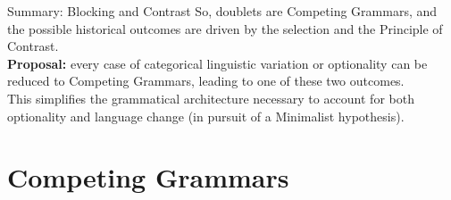 \documentclass[hyperref={pdfpagelabels=false}]{beamer}
\begin{document}
\begin{frame}{Summary: Blocking and Contrast}
	So, doublets are Competing Grammars, and the possible historical outcomes are driven by the selection and the Principle of Contrast.
\vspace{6mm}\\
	\textbf{Proposal:} every case of categorical linguistic variation or optionality can be reduced to Competing Grammars, leading to one of these two outcomes.
	\vspace{3mm}\\
	This simplifies the grammatical architecture necessary to account for both optionality and language change (in pursuit of a Minimalist hypothesis).
\end{frame}



%
%
%
\section{Competing Grammars}
\end{document}
